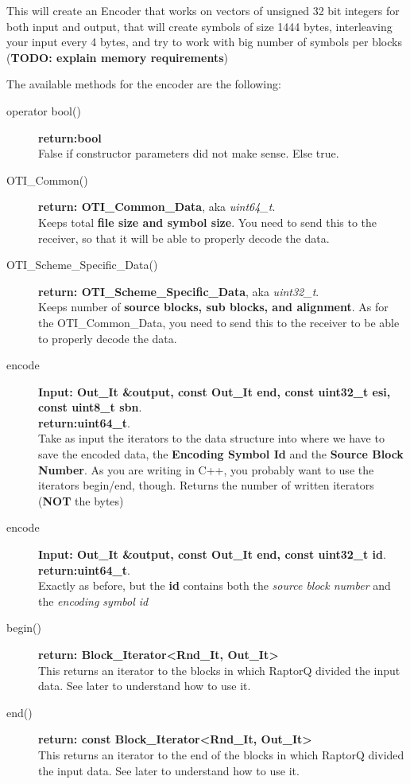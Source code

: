 \documentclass[11pt,a4paper]{refart}
\begin{document}
This will create an Encoder that works on vectors of unsigned 32 bit integers for both input and output, that will create symbols of size 1444 bytes, interleaving
your input every 4 bytes, and try to work with big number of symbols per blocks (\textbf{TODO: explain memory requirements})

The available methods for the encoder are the following:

\begin{description}
\item[operator bool()] \textbf{return:bool}\\
False if constructor parameters did not make sense. Else true.

\item[OTI\_Common()] \textbf{return: OTI\_Common\_Data}, aka \textit{uint64\_t}.\\
Keeps total \textbf{file size and symbol size}. You need to send this to the receiver, so that it will be able to properly decode the data.

\item[OTI\_Scheme\_Specific\_Data()] \textbf{return: OTI\_Scheme\_Specific\_Data}, aka \textit{uint32\_t}.\\
Keeps number of \textbf{source blocks, sub blocks, and alignment}. As for the OTI\_Common\_Data, you need to send this to the receiver to be able to
properly decode the data.

\item[encode] \textbf{Input: Out\_It \&output, const Out\_It end, const uint32\_t esi, const uint8\_t sbn}.\\
\textbf{return:uint64\_t}.\\
Take as input the iterators to the data structure into where we have to save the encoded data, the \textbf{Encoding Symbol Id} and the
\textbf{Source Block Number}. As you are writing in C++, you probably want to use the iterators begin/end, though. Returns the number of written
iterators (\textbf{NOT} the bytes)

\item[encode] \textbf{Input: Out\_It \&output, const Out\_It end, const uint32\_t id}.\\
\textbf{return:uint64\_t}.\\
Exactly as before, but the \textbf{id} contains both the \textit{source block number} and the \textit{encoding symbol id}

\item[begin()] \textbf{return: Block\_Iterator<Rnd\_It, Out\_It>}\\
This returns an iterator to the blocks in which RaptorQ divided the input data. See later to understand how to use it.
\item[end()] \textbf{return: const Block\_Iterator<Rnd\_It, Out\_It>}\\
This returns an iterator to the end of the blocks in which RaptorQ divided the input data. See later to understand how to use it.


\end{description}
\end{document}
